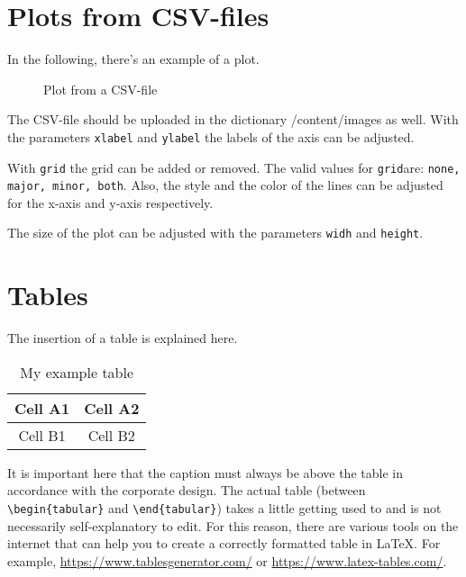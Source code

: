 \section{Plots from CSV-files}
In the following, there's an example of a plot.

\begin{figure}[H]
    \centering
    \caption{Plot from a CSV-file}
    \label{fig:exampleplot}
\end{figure}

The CSV-file should be uploaded in the dictionary /content/images as well. With the parameters \texttt{xlabel} and \texttt{ylabel} the labels of the axis can be adjusted.

With \texttt{grid} the grid can be added or removed. The valid values for \texttt{grid}are: \texttt{none, major, minor, both}. Also, the style and the color of the lines can be adjusted for the x-axis and y-axis respectively.

The size of the plot can be adjusted with the parameters \texttt{widh} and \texttt{height}.

\section{Tables}

The insertion of a table is explained here.

\begin{table}[H]
    \centering
    \caption{My example table}
    \label{tab:example}
    \begin{tabular}{|c|c|}
        \hline
        Cell A1 & Cell A2 \\
        \hline
        Cell B1 & Cell B2 \\
        \hline
    \end{tabular}
\end{table}

It is important here that the caption must always be above the table in accordance with the corporate design. The actual table (between \texttt{\textbackslash{}begin\{tabular\}} and \texttt{\textbackslash{}end\{tabular\}}) takes a little getting used to and is not necessarily self-explanatory to edit. For this reason, there are various tools on the internet that can help you to create a correctly formatted table in LaTeX. For example, \href{https://www.tablesgenerator.com/}{https://www.tablesgenerator.com/} or \href{https://www.latex-tables.com/}{https://www.latex-tables.com/}.

